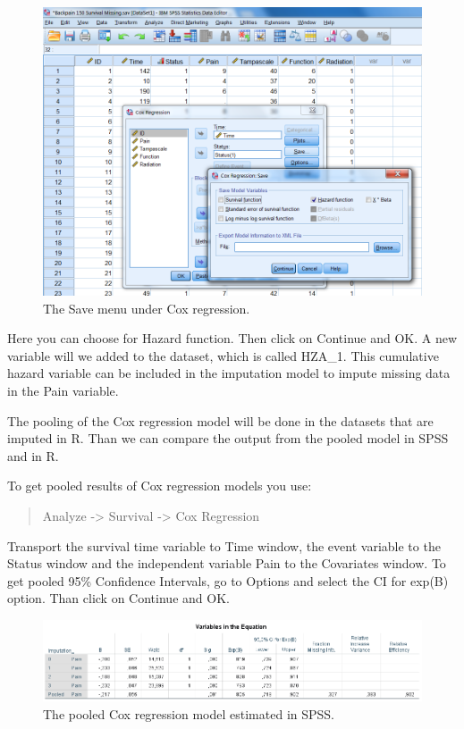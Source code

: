 \documentclass[]{book}
\begin{document}
\begin{figure}

{\centering \includegraphics[width=0.9\linewidth]{images/fig5.6} 

}

\caption{The Save menu under Cox regression.}\label{fig:fig5-6}
\end{figure}

Here you can choose for Hazard function. Then click on Continue and OK.
A new variable will we added to the dataset, which is called HZA\_1.
This cumulative hazard variable can be included in the imputation model
to impute missing data in the Pain variable.

The pooling of the Cox regression model will be done in the datasets
that are imputed in R. Than we can compare the output from the pooled
model in SPSS and in R.

To get pooled results of Cox regression models you use:

\begin{quote}
Analyze -\textgreater{} Survival -\textgreater{} Cox Regression
\end{quote}

Transport the survival time variable to Time window, the event variable
to the Status window and the independent variable Pain to the Covariates
window. To get pooled 95\% Confidence Intervals, go to Options and
select the CI for exp(B) option. Than click on Continue and OK.

\begin{figure}

{\centering \includegraphics[width=0.9\linewidth]{images/table5.10} 

}

\caption{The pooled Cox regression model estimated in SPSS.}\label{fig:tab5-10}
\end{figure}
\end{document}
